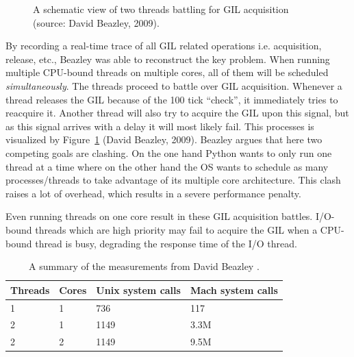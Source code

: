  \begin{figure}[h]
 	\caption{A schematic view of two threads battling for GIL acquisition (source: David Beazley, 2009).}
 	\label{fig:gil_battle_threads}
 \end{figure}

By recording a real-time trace of all GIL related operations i.e. acquisition, release, etc., Beazley was able to reconstruct the key problem.
When running multiple CPU-bound threads on multiple cores, all of them will be scheduled \emph{simultaneously}.
The threads proceed to battle over GIL acquisition. 
Whenever a thread releases the GIL because of the 100 tick \enquote{check}, it immediately tries to reacquire it.
Another thread will also try to acquire the GIL upon this signal, but as this signal arrives with a delay it will most likely fail.
This processes is visualized by Figure~\ref{fig:gil_battle_threads} (David Beazley, 2009).
Beazley argues that here two competing goals are clashing.
On the one hand Python wants to only run one thread at a time where on the other hand the OS wants to schedule as many processes/threads to take advantage of its multiple core architecture.
This clash raises a lot of overhead, which results in a severe performance penalty.

Even running threads on one core result in these GIL acquisition battles.
I/O-bound threads which are high priority may fail to acquire the GIL when a CPU-bound thread is busy, degrading the response time of the I/O thread.

\begin{table}[]
	\centering
	\caption{A summary of the measurements from David Beazley \cite{beazley2009inside}.}
	\label{tbl:system_calls_thread_switching}
	\begin{tabular}{|l|l|l|l|}
		\hline
	\textbf{Threads}	& \textbf{Cores} & \textbf{Unix system calls} & \textbf{Mach system calls} \\ \hline
	1	& 1 & 736 & 117 \\ \hline
	2	& 1 & 1149 & 3.3M \\ \hline
	2	& 2 & 1149 & 9.5M \\ \hline
	\end{tabular}
\end{table}

